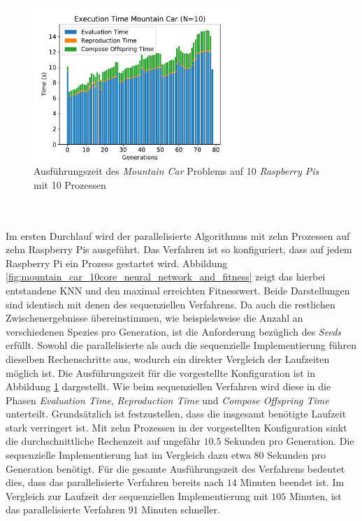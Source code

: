 \begin{figure}[!h]
	\centering
	\includegraphics[width=0.7\textwidth]{./img/mountain_car_analysis/1413_time_10cores_10pis.pdf} 
	\caption{Ausführungszeit des \emph{Mountain Car} Problems auf 10 \emph{Raspberry Pis} mit 10 Prozessen}
	\label{fig:mountain_car_time_10cores_10pi}
\end{figure}
\\\\
Im ersten Durchlauf wird der parallelisierte Algorithmus mit zehn Prozessen auf zehn Raspberry Pis ausgeführt. Das Verfahren ist so konfiguriert, dass auf jedem Raspberry Pi ein Prozess gestartet wird. Abbildung \ref{fig:mountain_car_10core_neural_network_and_fitness} zeigt das hierbei entstandene \ac{KNN} und den maximal erreichten Fitnesswert. Beide Darstellungen sind identisch mit denen des sequenziellen Verfahrens. Da auch die restlichen Zwischenergebnisse übereinstimmen, wie beispielsweise die Anzahl an verschiedenen Spezies pro Generation, ist die Anforderung bezüglich des \emph{Seeds} erfüllt. Sowohl die parallelisierte als auch die sequenzielle Implementierung führen dieselben Rechenschritte aus, wodurch ein direkter Vergleich der Laufzeiten möglich ist. Die Ausführungszeit für die vorgestellte Konfiguration ist in Abbildung  \ref{fig:mountain_car_time_10cores_10pi} dargestellt. Wie beim sequenziellen Verfahren wird diese in die Phasen \emph{Evaluation Time}, \emph{Reproduction Time} und \emph{Compose Offspring Time} unterteilt. Grundsätzlich ist festzustellen, dass die insgesamt benötigte Laufzeit stark verringert ist. Mit zehn Prozessen in der vorgestellten Konfiguration sinkt die durchschnittliche Rechenzeit auf ungefähr $10.5$ Sekunden pro Generation. Die sequenzielle Implementierung hat im Vergleich dazu etwa $80$ Sekunden pro Generation benötigt. Für die gesamte Ausführungszeit des Verfahrens bedeutet dies, dass das parallelisierte Verfahren bereits nach $14$ Minuten beendet ist. Im Vergleich zur Laufzeit der sequenziellen Implementierung mit $105$ Minuten, ist das parallelisierte Verfahren $91$ Minuten schneller.
